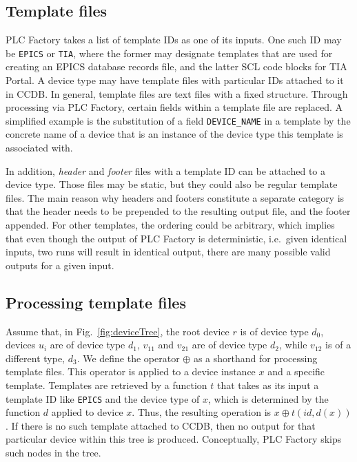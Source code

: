 \documentclass[a4paper,
              ]{jacow}
\begin{document}
\subsection{Template files}
PLC Factory takes a list of template IDs as one of its inputs. One such ID may be \texttt{EPICS} or \texttt{TIA}, where the former may designate templates that are used for creating an EPICS database records file, and the latter SCL code blocks for TIA Portal. A device type may have template files with particular IDs attached to it in CCDB. In general, template files are text files with a fixed structure. Through processing via PLC Factory, certain fields within a template file are replaced. A simplified example is the substitution of a field \texttt{DEVICE\_NAME} in a template by the concrete name of a device that is an instance of the device type this template is associated with.

In addition, \emph{header} and \emph{footer} files with a template ID can be attached to a device type. Those files may be static, but they could also be regular template files. The main reason why headers and footers constitute a separate category is that the header needs to be prepended to the resulting output file, and the footer appended. For other templates, the ordering could be arbitrary, which implies that even though the output of PLC Factory is deterministic, i.e.\ given identical inputs, two runs will result in identical output, there are many possible valid outputs for a given input.

\subsection{Processing template files}
Assume that, in Fig.\ \ref{fig:deviceTree}, the root device $r$ is of device type $d_0$, devices $u_i$ are of device type $d_1$, $v_{11}$ and $v_{21}$ are of device type $d_2$, while $v_{12}$ is of a different type, $d_3$. We define the operator $\oplus$ as a shorthand for processing template files. This operator is applied to a device instance $x$ and a specific template. Templates are retrieved by a function $t$ that takes as its input a template ID like \texttt{EPICS} and the device type of $x$, which is determined by the function $d$ applied to device $x$. Thus, the resulting operation is $x \oplus t(\mathit{id}, d(x))$. If there is no such template attached to CCDB, then no output for that particular device within this tree is produced. Conceptually, PLC Factory skips such nodes in the tree.
\end{document}
